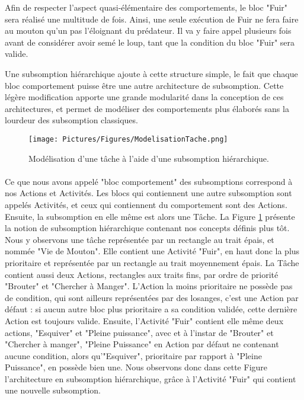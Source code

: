 			Afin de respecter l'aspect quasi-élémentaire des comportements, le bloc "Fuir" sera réalisé une multitude de fois. Ainsi, une seule exécution de Fuir ne fera faire au mouton qu'un pas l'éloignant du prédateur. Il va y faire appel plusieurs fois avant de considérer avoir semé le loup, tant que la condition du bloc "Fuir" sera valide.
			
			Une subsomption hiérarchique ajoute à cette structure simple, le fait que chaque bloc comportement puisse être une autre architecture de subsomption\cite{heckel_representational_2010}. Cette légère modification apporte une grande modularité dans la conception de ces architectures, et permet de modéliser des comportements plus élaborés sans la lourdeur des subsomption classiques.
			
			\begin{figure}
			\centering
			\texttt{[image: Pictures/Figures/ModelisationTache.png]}
			\caption{Modélisation d'une tâche à l'aide d'une subsomption hiérarchique.}
			\label{ModelisationTache}
			\end{figure}
		\paragraph{}
			
			Ce que nous avons appelé "bloc comportement" des subsomptions correspond à nos Actions et Activités. Les blocs qui contiennent une autre subsomption sont appelés Activités, et ceux qui contiennent du comportement sont des Actions. Ensuite, la subsomption en elle même est alors une Tâche. La Figure \ref{ModelisationTache} présente la notion de subsomption hiérarchique contenant nos concepts définis plus tôt. Nous y observons une tâche représentée par un rectangle au trait épais, et nommée "Vie de Mouton". Elle contient une Activité "Fuir", en haut donc la plus prioritaire et représentée par un rectangle au trait moyennement épais. La Tâche contient aussi deux Actions, rectangles aux traits fins, par ordre de priorité "Brouter" et "Chercher à Manger". L'Action la moins prioritaire ne possède pas de condition, qui sont ailleurs représentées par des losanges, c'est une Action par défaut : si aucun autre bloc plus prioritaire a sa condition validée, cette dernière Action est toujours valide. Ensuite, l'Activité "Fuir" contient elle même deux actions, "Esquiver" et "Pleine puissance", avec et à l'instar de "Brouter" et "Chercher à manger", "Pleine Puissance" en Action par défaut ne contenant aucune condition, alors qu'"Esquiver", prioritaire par rapport à "Pleine Puissance", en possède bien une. Nous observons donc dans cette Figure l'architecture en subsomption hiérarchique, grâce à l'Activité "Fuir" qui contient une nouvelle subsomption.
			
